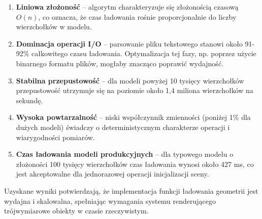 \begin{enumerate}
  \item \textbf{Liniowa złożoność} -- algorytm charakteryzuje się złożonością czasową $O(n)$, co oznacza, że czas ładowania rośnie proporcjonalnie do liczby wierzchołków w modelu.

  \item \textbf{Dominacja operacji I/O} -- parsowanie pliku tekstowego stanowi około 91-92\% całkowitego czasu ładowania. Optymalizacja tej fazy, np. poprzez użycie binarnego formatu plików, mogłaby znacząco poprawić wydajność.

  \item \textbf{Stabilna przepustowość} -- dla modeli powyżej 10 tysięcy wierzchołków przepustowość utrzymuje się na poziomie około 1,4 miliona wierzchołków na sekundę.

  \item \textbf{Wysoka powtarzalność} -- niski współczynnik zmienności (poniżej 1\% dla dużych modeli) świadczy o deterministycznym charakterze operacji i wiarygodności pomiarów.

  \item \textbf{Czas ładowania modeli produkcyjnych} -- dla typowego modelu o złożoności 100 tysięcy wierzchołków czas ładowania wynosi około 427 ms, co jest akceptowalne dla jednorazowej operacji inicjalizacji sceny.
\end{enumerate}

Uzyskane wyniki potwierdzają, że implementacja funkcji ładowania geometrii jest wydajna i skalowalna, spełniając wymagania systemu renderującego trójwymiarowe obiekty w czasie rzeczywistym.

